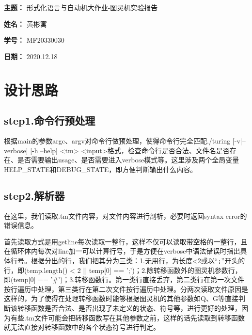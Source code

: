 \documentclass[UTF8]{article}
\begin{document}
    
{\flushleft \bf \Large 主题：} 形式化语言与自动机大作业-图灵机实验报告

{\flushleft \bf \Large 姓名：} 黄彬寓

{\flushleft \bf \Large 学号：} MF20330030

{\flushleft \bf \Large 日期：} 2020.12.18



\section{设计思路}
\subsection{step1.命令行预处理}
根据main的参数argc、argv对命令行做预处理，使得命令行完全匹配./turing [-v|--verbose] [-h|--help] <tm> <input>格式，检查命令行是否合法、文件名是否存在、是否需要输出usage、是否需要进入verbose模式等。这里涉及两个全局变量HELP\_STATE和DEBUG\_STATE，即方便判断输出什么内容。

\subsection{step2.解析器}
在这里，我们读取.tm文件内容，对文件内容进行剖析，必要时返回syntax error的错误信息。

首先读取方式是用getline每次读取一整行，这样不仅可以读取带空格的一整行，且在循环体内每次对line加一可以计算行号，于是方便在verbose中语法错误时指出具体行号。根据分出的行，我们把其分为三类：1.无用行，为长度<2或以``\verb|;|''开头的行，即(temp.length() < 2 || temp[0] == ';')；2.除转移函数外的图灵机参数行，即(temp[0] == '\#')；3.转移函数行。第一类行直接丢弃，第二类行在第一次文件按行遍历中处理，第三类行在第二次文件按行遍历中处理。分两次读取文件原因是这样的，为了使得在处理转移函数时能够根据图灵机的其他参数如Q、G等直接判断该转移函数是否合法、是否出现了未定义的状态、符号等，进行更好的处理，因为有些.tm文件可能会把转移函数写在其他参数之前，这样的话先读取到转移函数就无法直接对转移函数中的各个状态符号进行判定。
\end{document}
